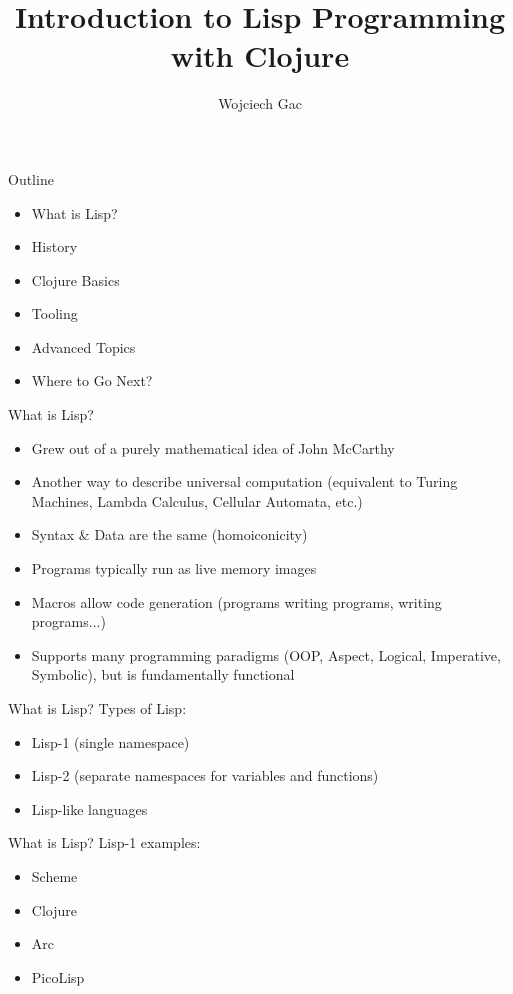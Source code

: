 \documentclass[pdf]{beamer}
\title{Introduction to Lisp Programming with Clojure}
\author{Wojciech Gac}
\begin{document}
\begin{frame}
  \titlepage
\end{frame}

\begin{frame}{Outline}
  \pause
  \begin{itemize}
  \item What is Lisp?
    \pause
  \item History
    \pause
  \item Clojure Basics
    \pause
  \item Tooling
    \pause
  \item Advanced Topics
    \pause
  \item Where to Go Next?
  \end{itemize}
\end{frame}

\begin{frame}{What is Lisp?}
  \pause
  \begin{itemize}
  \item Grew out of a purely mathematical idea of John McCarthy
    \pause
  \item Another way to describe universal computation (equivalent to Turing Machines, Lambda Calculus, Cellular Automata, etc.)
    \pause
  \item Syntax \& Data are the same (homoiconicity)
    \pause
  \item Programs typically run as live memory images
    \pause
  \item Macros allow code generation (programs writing programs, writing programs...)
    \pause
  \item Supports many programming paradigms (OOP, Aspect, Logical, Imperative, Symbolic), but is fundamentally functional
  \end{itemize}
\end{frame}

\begin{frame}{What is Lisp?}
  Types of Lisp:
  \pause
  \begin{itemize}
  \item Lisp-1 (single namespace)
    \pause
  \item Lisp-2 (separate namespaces for variables and functions)
    \pause
  \item Lisp-like languages
  \end{itemize}
\end{frame}

\begin{frame}{What is Lisp?}
  Lisp-1 examples:
  \pause
  \begin{itemize}
  \item Scheme
    \pause
  \item Clojure
    \pause
  \item Arc
    \pause
  \item PicoLisp
  \end{itemize}
\end{frame}
\end{document}

